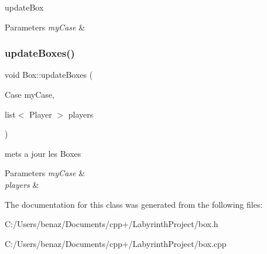 update\+Box 


\begin{DoxyParams}{Parameters}
{\em my\+Case} & \\
\hline
\end{DoxyParams}
\mbox{\label{class_box_a5e750fe0b615bb71255701f04975c3e8}} 
\subsubsection{\texorpdfstring{update\+Boxes()}{updateBoxes()}}
{\footnotesize\ttfamily void Box\+::update\+Boxes (\begin{DoxyParamCaption}\item[{Case}]{my\+Case,  }\item[{list$<$ Player $>$}]{players }\end{DoxyParamCaption})}



mets a jour les Boxes 


\begin{DoxyParams}{Parameters}
{\em my\+Case} & \\
\hline
{\em players} & \\
\hline
\end{DoxyParams}


The documentation for this class was generated from the following files\+:\begin{DoxyCompactItemize}
\item 
C\+:/\+Users/benaz/\+Documents/cpp+/\+Labyrinth\+Project/box.\+h\item 
C\+:/\+Users/benaz/\+Documents/cpp+/\+Labyrinth\+Project/box.\+cpp\end{DoxyCompactItemize}
